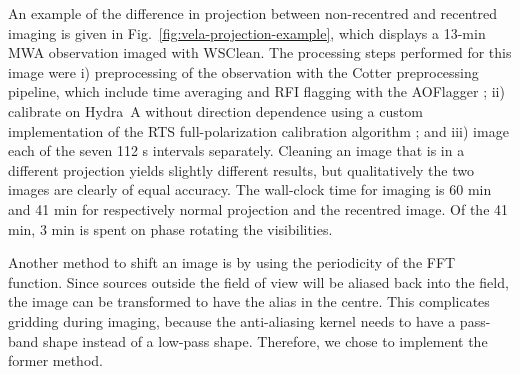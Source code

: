 \documentclass[useAMS,usenatbib]{mn2e}
\begin{document}
An example of the difference in projection between non-recentred and recentred imaging is given in Fig.~\ref{fig:vela-projection-example}, which displays a 13-min MWA observation imaged with WSClean. The processing steps performed for this image were i) preprocessing of the observation with the Cotter preprocessing pipeline, which include time averaging and RFI flagging with the AOFlagger \citep{post-correlation-rfi-classification,scale-invariant-rank-operator}; ii) calibrate on Hydra~A without direction dependence using a custom implementation of the RTS full-polarization calibration algorithm \citep{rts-mwa}; and iii) image each of the seven 112 s intervals separately. Cleaning an image that is in a different projection yields slightly different results, but qualitatively the two images are clearly of equal accuracy. The wall-clock time for imaging is 60 min and 41 min for respectively normal projection and the recentred image. Of the 41 min, 3 min is spent on phase rotating the visibilities.

Another method to shift an image is by using the periodicity of the FFT function. Since sources outside the field of view will be aliased back into the field, the image can be transformed to have the alias in the centre. This complicates gridding during imaging, because the anti-aliasing kernel needs to have a pass-band shape instead of a low-pass shape. Therefore, we chose to implement the former method.
\end{document}
